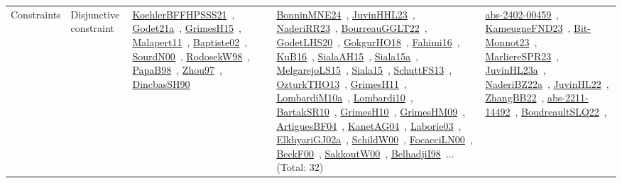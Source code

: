 {\begin{longtable}{lp{3cm}>{\raggedright\arraybackslash}p{6cm}>{\raggedright\arraybackslash}p{6cm}>{\raggedright\arraybackslash}p{8cm}}
Constraints & Disjunctive constraint & \href{../works/KoehlerBFFHPSSS21.pdf}{KoehlerBFFHPSSS21}~\cite{KoehlerBFFHPSSS21}, \href{../works/Godet21a.pdf}{Godet21a}~\cite{Godet21a}, \href{../works/GrimesH15.pdf}{GrimesH15}~\cite{GrimesH15}, \href{../works/Malapert11.pdf}{Malapert11}~\cite{Malapert11}, \href{../works/Baptiste02.pdf}{Baptiste02}~\cite{Baptiste02}, \href{../works/SourdN00.pdf}{SourdN00}~\cite{SourdN00}, \href{../works/RodosekW98.pdf}{RodosekW98}~\cite{RodosekW98}, \href{../works/PapaB98.pdf}{PapaB98}~\cite{PapaB98}, \href{../works/Zhou97.pdf}{Zhou97}~\cite{Zhou97}, \href{../works/DincbasSH90.pdf}{DincbasSH90}~\cite{DincbasSH90} & \href{../works/BonninMNE24.pdf}{BonninMNE24}~\cite{BonninMNE24}, \href{../works/JuvinHHL23.pdf}{JuvinHHL23}~\cite{JuvinHHL23}, \href{../works/NaderiRR23.pdf}{NaderiRR23}~\cite{NaderiRR23}, \href{../works/BourreauGGLT22.pdf}{BourreauGGLT22}~\cite{BourreauGGLT22}, \href{../works/GodetLHS20.pdf}{GodetLHS20}~\cite{GodetLHS20}, \href{../works/GokgurHO18.pdf}{GokgurHO18}~\cite{GokgurHO18}, \href{../works/Fahimi16.pdf}{Fahimi16}~\cite{Fahimi16}, \href{../works/KuB16.pdf}{KuB16}~\cite{KuB16}, \href{../works/SialaAH15.pdf}{SialaAH15}~\cite{SialaAH15}, \href{../works/Siala15a.pdf}{Siala15a}~\cite{Siala15a}, \href{../works/MelgarejoLS15.pdf}{MelgarejoLS15}~\cite{MelgarejoLS15}, \href{../works/Siala15.pdf}{Siala15}~\cite{Siala15}, \href{../works/SchuttFS13.pdf}{SchuttFS13}~\cite{SchuttFS13}, \href{../works/OzturkTHO13.pdf}{OzturkTHO13}~\cite{OzturkTHO13}, \href{../works/GrimesH11.pdf}{GrimesH11}~\cite{GrimesH11}, \href{../works/LombardiM10a.pdf}{LombardiM10a}~\cite{LombardiM10a}, \href{../works/Lombardi10.pdf}{Lombardi10}~\cite{Lombardi10}, \href{../works/BartakSR10.pdf}{BartakSR10}~\cite{BartakSR10}, \href{../works/GrimesH10.pdf}{GrimesH10}~\cite{GrimesH10}, \href{../works/GrimesHM09.pdf}{GrimesHM09}~\cite{GrimesHM09}, \href{../works/ArtiguesBF04.pdf}{ArtiguesBF04}~\cite{ArtiguesBF04}, \href{../works/KanetAG04.pdf}{KanetAG04}~\cite{KanetAG04}, \href{../works/Laborie03.pdf}{Laborie03}~\cite{Laborie03}, \href{../works/ElkhyariGJ02a.pdf}{ElkhyariGJ02a}~\cite{ElkhyariGJ02a}, \href{../works/SchildW00.pdf}{SchildW00}~\cite{SchildW00}, \href{../works/FocacciLN00.pdf}{FocacciLN00}~\cite{FocacciLN00}, \href{../works/BeckF00.pdf}{BeckF00}~\cite{BeckF00}, \href{../works/SakkoutW00.pdf}{SakkoutW00}~\cite{SakkoutW00}, \href{../works/BelhadjiI98.pdf}{BelhadjiI98}~\cite{BelhadjiI98}... (Total: 32) & \href{../works/abs-2402-00459.pdf}{abs-2402-00459}~\cite{abs-2402-00459}, \href{../works/KameugneFND23.pdf}{KameugneFND23}~\cite{KameugneFND23}, \href{../works/Bit-Monnot23.pdf}{Bit-Monnot23}~\cite{Bit-Monnot23}, \href{../works/MarliereSPR23.pdf}{MarliereSPR23}~\cite{MarliereSPR23}, \href{../works/JuvinHL23a.pdf}{JuvinHL23a}~\cite{JuvinHL23a}, \href{../works/NaderiBZ22a.pdf}{NaderiBZ22a}~\cite{NaderiBZ22a}, \href{../works/JuvinHL22.pdf}{JuvinHL22}~\cite{JuvinHL22}, \href{../works/ZhangBB22.pdf}{ZhangBB22}~\cite{ZhangBB22}, \href{../works/abs-2211-14492.pdf}{abs-2211-14492}~\cite{abs-2211-14492}, \href{../works/BoudreaultSLQ22.pdf}{BoudreaultSLQ22}~\cite{BoudreaultSLQ22}, 
\end{longtable}}
